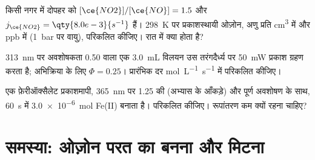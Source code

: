 \begin{exercise}[$\star\star\star$]\label{exo:b3:photochemistry:10}
किसी नगर में दोपहर को $[\ce{NO2}]/[\ce{NO}] = 1.5$ और $j_{\ce{NO2}} = \qty{8.0e-3}{s^{-1}}$ हैं।
\qty{298}{K} पर प्रकाशस्थायी ओज़ोन, अणु प्रति \unit{cm^3} में और ppb में (\qty{1}{bar} पर वायु), परिकलित कीजिए।
रात में क्या होता है?
\end{exercise}

\begin{exercise}[$\star\star\star$]\label{exo:b3:photochemistry:11}
\qty{313}{nm} पर अवशोषकता 0.50 वाला एक \qty{3.0}{mL} विलयन उस तरंगदैर्ध्य पर \qty{50}{mW}
प्रकाश ग्रहण करता है; अभिक्रिया के लिए $\Phi = 0.25$। प्रारंभिक दर
\unit{mol.L^{-1}.s^{-1}} में परिकलित कीजिए।
\end{exercise}

\begin{exercise}[$\star\star\star$]\label{exo:b3:photochemistry:12}
एक फ़ेरीऑक्सैलेट प्रकाशमापी, \qty{365}{nm} पर 1.25 की  (अभ्यास के
आँकड़े) और पूर्ण अवशोषण के साथ, \qty{60}{s} में \qty{3.0e-6}{mol} Fe(II) बनाता है।
 परिकलित कीजिए। रूपांतरण कम क्यों रहना चाहिए?
\end{exercise}

\section{समस्या: ओज़ोन परत का बनना और मिटना}

